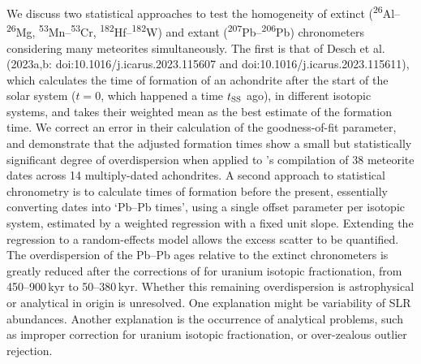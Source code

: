 \newcommand{\tSS}{\mbox{$t_{\rm SS}$}}
\newcommand{\tAl}{\mbox{$t_{\rm Al}$}}
\newcommand{\tMn}{\mbox{$t_{\rm Mn}$}}
\newcommand{\tHf}{\mbox{$t_{\rm Hf}$}}
\newcommand{\tPb}{\mbox{$t_{\rm Pb}$}}
\newcommand{\alratio}{\mbox{${}^{26}{\rm Al}/{}^{27}{\rm Al}$}}
\newcommand{\mnratio}{\mbox{${}^{53}{\rm Mn}/{}^{55}{\rm Mn}$}}
\newcommand{\hfratio}{\mbox{${}^{182}{\rm Hf}/{}^{180}{\rm Hf}$}}

We discuss two statistical approaches to test the homogeneity of
extinct (\textsuperscript{26}Al--\textsuperscript{26}Mg,
\textsuperscript{53}Mn--\textsuperscript{53}Cr,
\textsuperscript{182}Hf--\textsuperscript{182}W) and extant
(\textsuperscript{207}Pb--\textsuperscript{206}Pb) chronometers
considering many meteorites simultaneously.  The first is that of
Desch et al. (2023a,b: doi:10.1016/j.icarus.2023.115607 and
doi:10.1016/j.icarus.2023.115611), which calculates the time of
formation of an achondrite after the start of the solar system ($t=0$,
which happened a time $t_{\rm SS}$ ago), in different isotopic
systems, and takes their weighted mean as the best estimate of the
formation time.  We correct an error in their calculation of the
goodness-of-fit parameter, and demonstrate that the adjusted formation
times show a small but statistically significant degree of
overdispersion when applied to \citet{desch2023a,desch2023b}'s
compilation of 38 meteorite dates across 14 multiply-dated
achondrites.  A second approach to statistical chronometry is to
calculate times of formation before the present, essentially
converting dates into `Pb--Pb times', using a single offset parameter
per isotopic system, estimated by a weighted regression with a fixed
unit slope.  Extending the regression to a random-effects model allows
the excess scatter to be quantified.  The overdispersion of the Pb--Pb
ages relative to the extinct chronometers is greatly reduced after the
corrections of \citet{desch2023a,desch2023b} for uranium isotopic
fractionation, from 450--900\,kyr to 50--380\,kyr.  Whether this
remaining overdispersion is astrophysical or analytical in origin is
unresolved. One explanation might be variability of SLR
abundances. Another explanation is the occurrence of analytical
problems, such as improper correction for uranium isotopic
fractionation, or over-zealous outlier rejection.
